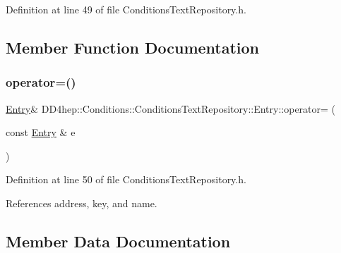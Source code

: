 Definition at line 49 of file Conditions\+Text\+Repository.\+h.



\subsection{Member Function Documentation}
\hypertarget{class_d_d4hep_1_1_conditions_1_1_conditions_text_repository_1_1_entry_a16b49e4960ded6fa394dc3173f37dd4e}{}\label{class_d_d4hep_1_1_conditions_1_1_conditions_text_repository_1_1_entry_a16b49e4960ded6fa394dc3173f37dd4e} 
\subsubsection{\texorpdfstring{operator=()}{operator=()}}
{\footnotesize\ttfamily \hyperlink{class_d_d4hep_1_1_conditions_1_1_conditions_text_repository_1_1_entry}{Entry}\& D\+D4hep\+::\+Conditions\+::\+Conditions\+Text\+Repository\+::\+Entry\+::operator= (\begin{DoxyParamCaption}\item[{const \hyperlink{class_d_d4hep_1_1_conditions_1_1_conditions_text_repository_1_1_entry}{Entry} \&}]{e }\end{DoxyParamCaption})\hspace{0.3cm}{\ttfamily [inline]}}



Definition at line 50 of file Conditions\+Text\+Repository.\+h.



References address, key, and name.



\subsection{Member Data Documentation}
\hypertarget{class_d_d4hep_1_1_conditions_1_1_conditions_text_repository_1_1_entry_a29d5e08d84bea3989d09c5799f3f1393}{}\label{class_d_d4hep_1_1_conditions_1_1_conditions_text_repository_1_1_entry_a29d5e08d84bea3989d09c5799f3f1393} 
